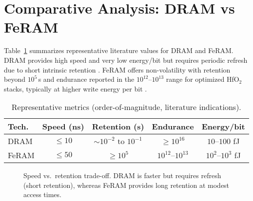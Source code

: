
\section{Comparative Analysis: DRAM vs FeRAM}
\label{sec:comparison}

Table~\ref{tab:comparison} summarizes representative literature values for DRAM and FeRAM. DRAM provides high speed and very low energy/bit but requires periodic refresh due to short intrinsic retention \cite{choi2022,kim2021_dram,iedm2023_dram}. FeRAM offers non-volatility with retention beyond $10^{5}$\,s and endurance reported in the $10^{12}$--$10^{13}$ range for optimized HfO$_2$ stacks, typically at higher write energy per bit \cite{boscke2011,mueller2012,noheda2023,martin2020}.

\begin{table}[!t]
\centering
\caption{Representative metrics (order-of-magnitude, literature indications).}
\label{tab:comparison}
\begin{tabular}{lcccc}
\toprule
Tech. & Speed (ns) & Retention (s) & Endurance & Energy/bit \\
\midrule
DRAM  & $\le 10$  & $\sim 10^{-2}$ to $10^{-1}$ & $\ge 10^{16}$ & $10$--$100$ fJ \\
FeRAM & $\le 50$  & $\ge 10^{5}$                & $10^{12}$--$10^{13}$ & $10^{2}$--$10^{3}$ fJ \\
\bottomrule
\end{tabular}
\end{table}

\begin{figure}[!t]
\centering
{}
\caption{Speed vs.\ retention trade-off. DRAM is faster but requires refresh (short retention), whereas FeRAM provides long retention at modest access times.}
\label{fig:speed_retention}
\end{figure}

